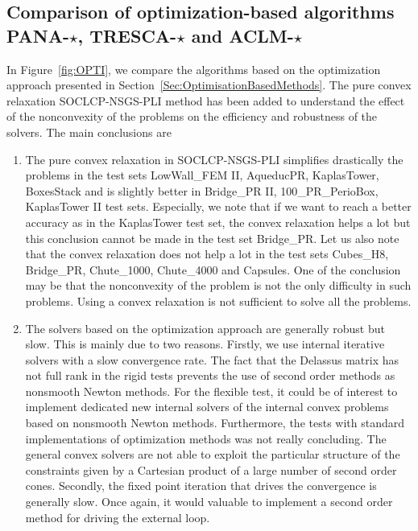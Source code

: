 \subsection{Comparison of optimization-based algorithms {\sf PANA-$\star$, TRESCA-$\star$ and ACLM-$\star$}}

In Figure~\ref{fig:OPTI}, we compare the algorithms based on the optimization approach presented in Section~\ref{Sec:OptimisationBasedMethods}. The pure convex relaxation {\sf SOCLCP-NSGS-PLI}  method has been added to understand the effect of the nonconvexity of the problems on the efficiency and robustness of the solvers. The main conclusions are
\begin{enumerate}
\item The pure convex relaxation in {\sf SOCLCP-NSGS-PLI}  simplifies drastically the problems in the test sets  LowWall\_FEM II, AqueducPR, KaplasTower, BoxesStack  and is slightly better in Bridge\_PR II, 100\_PR\_PerioBox, KaplasTower II test sets. Especially, we note that if we want to reach a better accuracy as in the KaplasTower test set, the convex relaxation helps a lot but this conclusion cannot be made in the test set Bridge\_PR. Let us also note that  the convex relaxation does not help a lot in the test sets Cubes\_H8, Bridge\_PR, Chute\_1000, Chute\_4000 and Capsules. One of the conclusion may be that the nonconvexity of the problem is not the only difficulty in such problems. Using a convex relaxation is not sufficient to solve all the problems.
\item The solvers based on the optimization approach are generally robust but slow. This is mainly due to two reasons. Firstly,  we use internal iterative solvers with a slow convergence rate. The fact that  the Delassus matrix has not full rank in the rigid tests prevents the use of second order methods as nonsmooth Newton methods.  For the flexible test, it could be of interest to implement dedicated new internal solvers of the internal convex problems based on nonsmooth Newton methods. Furthermore, the tests with standard implementations of optimization methods was not really concluding. The general convex solvers are not  able to exploit the particular structure of the constraints given by a Cartesian product of a large number of second order cones. Secondly, the fixed point iteration that drives the convergence is generally slow. Once again, it would valuable to implement a second order method for driving the external loop.

\end{enumerate}
